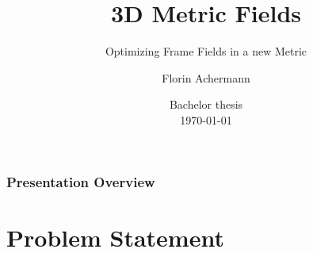 \documentclass[
	11pt, %
	aspectratio=169, %
]{beamer}
\title[3D Metric Fields]{3D Metric Fields} %
\subtitle{Optimizing Frame Fields in a new Metric} %
\author[Florin Achermann]{Florin Achermann} %
\institute[Unibe]{University of Berne} %
\date[\today]{Bachelor thesis \\ \today} %
\begin{document}

\begin{frame}
	\titlepage %
\end{frame}



\begin{frame}
	\frametitle{Presentation Overview} %
	
	\tableofcontents %
\end{frame}


\section{Problem Statement} %
\end{document}
